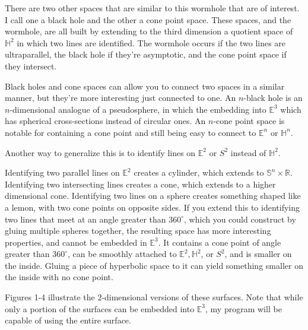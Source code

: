 \documentclass[12pt]{amsart}
\begin{document}
There are two other spaces that are similar to this wormhole that are of interest. I call one a black hole and the other a cone point space. These spaces, and the wormhole, are all built by extending to the third dimension a quotient space of $\mathbb{H}^2$ in which two lines are identified. The wormhole occurs if the two lines are ultraparallel, the black hole if they're asymptotic, and the cone point space if they intersect.

Black holes and cone spaces can allow you to connect two spaces in a similar manner, but they're more interesting just connected to one. An $n$-black hole is an $n$-dimensional analogue of a pseudosphere, in which the embedding into $\mathbb{E}^3$ which has spherical cross-sections instead of circular ones. An $n$-cone point space is notable for containing a cone point and still being easy to connect to $\mathbb{E}^n$ or $\mathbb{H}^n$.

Another way to generalize this is to identify lines on $\mathbb{E}^2$ or $S^2$ instead of $\mathbb{H}^2$.

Identifying two parallel lines on $\mathbb{E}^2$ creates a cylinder, which extends to $\mathbb{S}^n \times \mathbb{R}$. Identifying two intersecting lines creates a cone, which extends to a higher dimensional cone. Identifying two lines on a sphere creates something shaped like a lemon, with two cone points on opposite sides. If you extend this to identifying two lines that meet at an angle greater than $360^\circ$, which you could construct by gluing multiple spheres together, the resulting space has more interesting properties, and cannot be embedded in $\mathbb{E}^3$.  It contains a cone point of angle greater than $360^\circ$, can be smoothly attached to $\mathbb{E}^2, \mathbb{H}^2$, or $S^2$, and is smaller on the inside. Gluing a piece of hyperbolic space to it can yield something smaller on the inside with no cone point.

Figures 1-4 illustrate the $2$-dimensional versions of these surfaces. Note that while only a portion of the surfaces can be embedded into $\mathbb{E}^3$, my program will be capable of using the entire surface.
\end{document}
